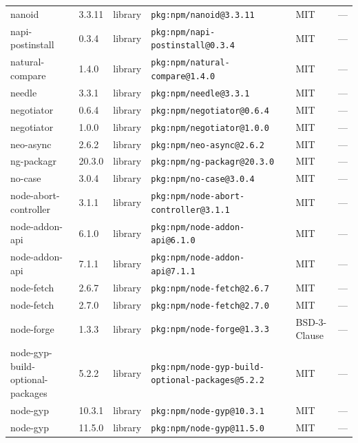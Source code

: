 \documentclass[11pt,a4paper]{article}
\begin{document}
\begin{longtable}{|p{4cm}|p{2cm}|p{1.6cm}|p{5cm}|p{1.5cm}|p{3.5cm}|}
\raggedright nanoid & 3.3.11 & library & \small\texttt{pkg:npm/nanoid@3.3.11} & MIT & \small — \\
\raggedright napi-postinstall & 0.3.4 & library & \small\texttt{pkg:npm/napi-postinstall@0.3.4} & MIT & \small — \\
\raggedright natural-compare & 1.4.0 & library & \small\texttt{pkg:npm/natural-compare@1.4.0} & MIT & \small — \\
\raggedright needle & 3.3.1 & library & \small\texttt{pkg:npm/needle@3.3.1} & MIT & \small — \\
\raggedright negotiator & 0.6.4 & library & \small\texttt{pkg:npm/negotiator@0.6.4} & MIT & \small — \\
\raggedright negotiator & 1.0.0 & library & \small\texttt{pkg:npm/negotiator@1.0.0} & MIT & \small — \\
\raggedright neo-async & 2.6.2 & library & \small\texttt{pkg:npm/neo-async@2.6.2} & MIT & \small — \\
\raggedright ng-packagr & 20.3.0 & library & \small\texttt{pkg:npm/ng-packagr@20.3.0} & MIT & \small — \\
\raggedright no-case & 3.0.4 & library & \small\texttt{pkg:npm/no-case@3.0.4} & MIT & \small — \\
\raggedright node-abort-controller & 3.1.1 & library & \small\texttt{pkg:npm/node-abort-controller@3.1.1} & MIT & \small — \\
\raggedright node-addon-api & 6.1.0 & library & \small\texttt{pkg:npm/node-addon-api@6.1.0} & MIT & \small — \\
\raggedright node-addon-api & 7.1.1 & library & \small\texttt{pkg:npm/node-addon-api@7.1.1} & MIT & \small — \\
\raggedright node-fetch & 2.6.7 & library & \small\texttt{pkg:npm/node-fetch@2.6.7} & MIT & \small — \\
\raggedright node-fetch & 2.7.0 & library & \small\texttt{pkg:npm/node-fetch@2.7.0} & MIT & \small — \\
\raggedright node-forge & 1.3.3 & library & \small\texttt{pkg:npm/node-forge@1.3.3} & BSD-3-Clause & \small — \\
\raggedright node-gyp-build-optional-packages & 5.2.2 & library & \small\texttt{pkg:npm/node-gyp-build-optional-packages@5.2.2} & MIT & \small — \\
\raggedright node-gyp & 10.3.1 & library & \small\texttt{pkg:npm/node-gyp@10.3.1} & MIT & \small — \\
\raggedright node-gyp & 11.5.0 & library & \small\texttt{pkg:npm/node-gyp@11.5.0} & MIT & \small — \\

\end{longtable}
\end{document}
